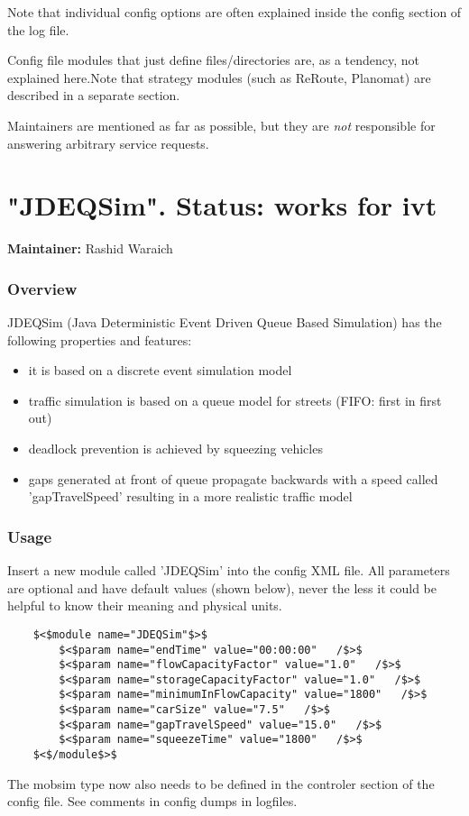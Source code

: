 \documentclass[a4paper,11pt]{report}
\begin{document}
Note that individual config options are often explained inside the config section of the log file.

Config file modules that just define files/directories are, as a tendency, not explained here.Note that strategy modules (such as ReRoute, Planomat) are described in a separate section.

Maintainers are mentioned as far as possible, but they are \emph{not} responsible for answering arbitrary service requests.

\vfill\eject
\section{"JDEQSim".  Status: works for ivt}

\textbf{Maintainer:} Rashid Waraich

\subsubsection{Overview}

JDEQSim (Java Deterministic Event Driven Queue Based Simulation) has the following properties and features:
\begin{itemize}
	\item it is based on a discrete event simulation model
	\item traffic simulation is based on a queue model for streets (FIFO: first in first out)
	\item deadlock prevention is achieved by squeezing vehicles
	\item gaps  generated at front of queue propagate backwards with a speed called  'gapTravelSpeed' resulting in a more realistic traffic model
\end{itemize}

\subsubsection{Usage}

Insert  a new module called 'JDEQSim' into the config XML file. All parameters  are optional and have default values (shown below), never the less it  could be helpful to know their meaning and physical units.
\begin{verbatim}
	$<$module name="JDEQSim"$>$
		$<$param name="endTime" value="00:00:00"   /$>$
		$<$param name="flowCapacityFactor" value="1.0"   /$>$
		$<$param name="storageCapacityFactor" value="1.0"   /$>$
		$<$param name="minimumInFlowCapacity" value="1800"   /$>$
		$<$param name="carSize" value="7.5"   /$>$
		$<$param name="gapTravelSpeed" value="15.0"   /$>$
		$<$param name="squeezeTime" value="1800"   /$>$
	$<$/module$>$
\end{verbatim}The mobsim type now  also needs to be defined in the controler section of the config  file. See comments in config dumps in logfiles.
\end{document}
